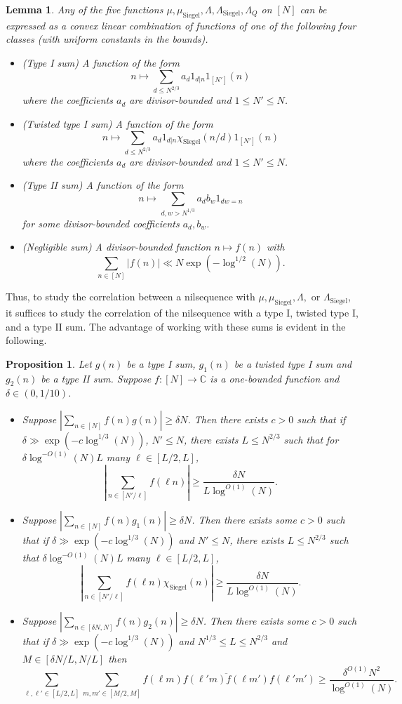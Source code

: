 \documentclass[11pt, a4paper]{amsart}
\theoremstyle{plain}
\theoremstyle{plain}
\newtheorem{lemma}{Lemma}
\newtheorem{proposition}{Proposition}
\theoremstyle{definition}
\theoremstyle{remark}
\numberwithin{equation}{section}
\numberwithin{lemma}{section}
\numberwithin{proposition}{section}
\numberwithin{corollary}{section}
\numberwithin{definition}{section}
\numberwithin{claim}{section}
\begin{document}
\begin{lemma}\label{l:type1type2decomposition}
Any of the five functions $\mu, \mu_{\mathrm{Siegel}}, \Lambda, \Lambda_{\mathrm{Siegel}}, \Lambda_Q$ on $[N]$ can be expressed as a convex linear combination of functions of one of the following four classes (with uniform constants in the bounds).
\begin{itemize}
    \item[(i)] (Type I sum) A function of the form
    $$n \mapsto \sum_{d \le N^{2/3}} a_d 1_{d|n} 1_{[N']}(n)$$
    where the coefficients $a_d$ are divisor-bounded and $1 \le N' \le N$.
    \item[(ii)] (Twisted type I sum) A function of the form
    $$n \mapsto \sum_{d \le N^{2/3}} a_d 1_{d|n} \chi_{\mathrm{Siegel}}(n/d)1_{[N']}(n)$$
    where the coefficients $a_d$ are divisor-bounded and $1 \le N' \le N$.
    \item[(iii)] (Type II sum) A function of the form
    $$n \mapsto \sum_{d, w > N^{1/3}} a_d b_w 1_{dw = n}$$
    for some divisor-bounded coefficients $a_d, b_w$.
    \item[(iv)] (Negligible sum) A divisor-bounded function $n \mapsto f(n)$ with
    $$\sum_{n \in [N]} |f(n)| \ll N \exp(-\log^{1/2}(N)).$$
\end{itemize}
\end{lemma}
Thus, to study the correlation between a nilsequence with $\mu, \mu_{\mathrm{Siegel}}, \Lambda, $ or $\Lambda_{\mathrm{Siegel}}$, it suffices to study the correlation of the nilsequence with a type I, twisted type I, and a type II sum. The advantage of working with these sums is evident in the following.
\begin{proposition}\label{p:type1type2correlation}
Let $g(n)$ be a type I sum, $g_1(n)$ be a twisted type I sum and $g_2(n)$ be a type II sum. Suppose $f\colon [N] \to \mathbb{C}$ is a one-bounded function and $\delta \in (0, 1/10)$.
\begin{itemize}
    \item Suppose $\left|\sum_{n \in [N]} f(n)g(n)\right| \ge \delta N$. Then there exists $c > 0$ such that if $\delta \gg \exp(-c\log^{1/3}(N))$, $N' \le N$, there exists $L \le N^{2/3}$ such that for $\delta \log^{-O(1)}(N)L$ many $\ell \in [L/2, L]$,
    $$\left|\sum_{n \in [N'/\ell]} f(\ell n)\right| \ge \frac{\delta N}{L\log^{O(1)}(N)}.$$
    \item Suppose $\left|\sum_{n \in [N]} f(n)g_1(n)\right| \ge \delta N $. Then there exists some $c > 0$ such that if $\delta \gg \exp(-c\log^{1/3}(N))$ and $N' \le N$, there exists $L \le N^{2/3}$ such that $\delta \log^{-O(1)}(N)L$ many $\ell \in [L/2, L]$,
    $$\left|\sum_{n \in [N'/\ell]} f(\ell n)\chi_{\mathrm{Siegel}}(n)\right| \ge \frac{\delta N}{L\log^{O(1)}(N)}.$$
    \item Suppose $\left|\sum_{n \in [\delta N, N]} f(n)g_2(n)\right| \ge \delta N$. Then there exists some $c > 0$ such that if $\delta \gg \exp(-c\log^{1/3}(N))$ and $N^{1/3} \le L \le N^{2/3}$ and $M \in [\delta N/L, N/L]$ then
    $$\sum_{\ell, \ell' \in [L/2, L]} \sum_{m, m' \in [M/2, M]} f(\ell m)\overline{f(\ell'm)f(\ell m')}f(\ell'm') \ge \frac{\delta^{O(1)}N^2}{\log^{O(1)}(N)}.$$
\end{itemize}
\end{proposition}
\end{document}

